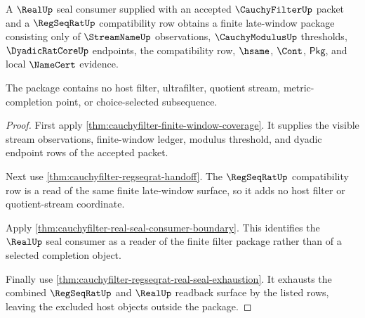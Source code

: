 \begin{theorem}
\label{thm:cauchyfilter-mature-real-consumer-example}
A $\RealUp$ seal consumer supplied with an accepted $\CauchyFilterUp$ packet
and a $\RegSeqRatUp$ compatibility row obtains a finite late-window package
consisting only of $\StreamNameUp$ observations, $\CauchyModulusUp$ thresholds,
$\DyadicRatCoreUp$ endpoints, the compatibility row, $\hsame$, $\Cont$,
$\mathsf{Pkg}$, and local $\NameCert$ evidence.

The package contains no host filter, ultrafilter, quotient stream,
metric-completion point, or choice-selected subsequence.
\end{theorem}
\begin{proof}
First apply \autoref{thm:cauchyfilter-finite-window-coverage}. It supplies the
visible stream observations, finite-window ledger, modulus threshold, and
dyadic endpoint rows of the accepted packet.

Next use \autoref{thm:cauchyfilter-regseqrat-handoff}. The
$\RegSeqRatUp$ compatibility row is a read of the same finite late-window
surface, so it adds no host filter or quotient-stream coordinate.

Apply \autoref{thm:cauchyfilter-real-seal-consumer-boundary}. This identifies
the $\RealUp$ seal consumer as a reader of the finite filter package rather than
of a selected completion object.

Finally use \autoref{thm:cauchyfilter-regseqrat-real-seal-exhaustion}. It
exhausts the combined $\RegSeqRatUp$ and $\RealUp$ readback surface by the
listed rows, leaving the excluded host objects outside the package.
\end{proof}


\begin{closurestatus}{\CauchyFilterUp}
  \theoryclosure{\matureClosure}
  \formalstatus{\axiomCleanV}
\end{closurestatus}
